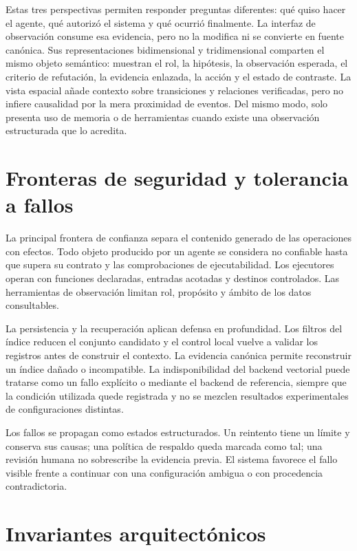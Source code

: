 Estas tres perspectivas permiten responder preguntas diferentes: qué quiso
hacer el agente, qué autorizó el sistema y qué ocurrió finalmente. La interfaz
de observación consume esa evidencia, pero no la modifica ni se convierte en
fuente canónica. Sus representaciones bidimensional y tridimensional comparten
el mismo objeto semántico: muestran el rol, la hipótesis, la observación
esperada, el criterio de refutación, la evidencia enlazada, la acción y el
estado de contraste. La vista espacial añade contexto sobre transiciones y
relaciones verificadas, pero no infiere causalidad por la mera proximidad de
eventos. Del mismo modo, solo presenta uso de memoria o de herramientas cuando
existe una observación estructurada que lo acredita.

\section{Fronteras de seguridad y tolerancia a fallos}

La principal frontera de confianza separa el contenido generado de las
operaciones con efectos. Todo objeto producido por un agente se considera no
confiable hasta que supera su contrato y las comprobaciones de ejecutabilidad.
Los ejecutores operan con funciones declaradas, entradas acotadas y destinos
controlados. Las herramientas de observación limitan rol, propósito y ámbito
de los datos consultables.

La persistencia y la recuperación aplican defensa en profundidad. Los filtros
del índice reducen el conjunto candidato y el control local vuelve a validar
los registros antes de construir el contexto. La evidencia canónica permite
reconstruir un índice dañado o incompatible. La indisponibilidad del backend
vectorial puede tratarse como un fallo explícito o mediante el backend de
referencia, siempre que la condición utilizada quede registrada y no se mezclen
resultados experimentales de configuraciones distintas.

Los fallos se propagan como estados estructurados. Un reintento tiene un límite
y conserva sus causas; una política de respaldo queda marcada como tal; una
revisión humana no sobrescribe la evidencia previa. El sistema favorece el
fallo visible frente a continuar con una configuración ambigua o con
procedencia contradictoria.

\section{Invariantes arquitectónicos}

